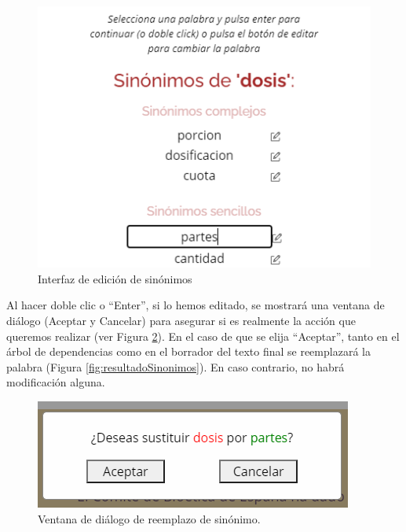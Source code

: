 \begin{figure}[h!]
\centering


\includegraphics[scale=1.0]{Imagenes/Figuras/EditarSinonimo}


\caption{Interfaz de edición de sinónimos}
\label{fig:edicionSinonimos}
\end{figure}
Al hacer doble clic o ``Enter'', si lo hemos editado, se mostrará una ventana de diálogo (Aceptar y Cancelar) para asegurar si es realmente la acción que queremos realizar (ver Figura \ref{fig:modalSinonimos}). En el caso de que se elija ``Aceptar'', tanto en el árbol de dependencias como en el borrador del texto final se reemplazará la palabra (Figura \ref{fig:resultadoSinonimos}). En caso contrario, no habrá modificación alguna.

\begin{figure}[h!]
	\centering
	
	
	\includegraphics[scale=1.0]{Imagenes/Figuras/modalSinonimos}
	
	
	\caption{Ventana de diálogo de reemplazo de sinónimo.}
	\label{fig:modalSinonimos}
\end{figure}


